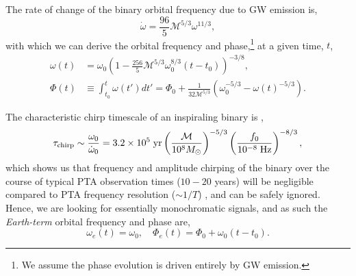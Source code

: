 \documentclass[prd,twocolumn,showpacs,nofootinbib]{revtex4}
\begin{document}
The rate of change of the binary orbital frequency due to GW emission is,
\begin{equation}
\dot{\omega} = \frac{96}{5}\mathcal{M}^{5/3}\omega^{11/3},
\end{equation}
with which we can derive the orbital frequency and phase,\footnote{We assume the phase evolution is driven entirely by GW emission.}  at a given time, $t$,
\begin{align} \label{eq:FullFreqPhase}
\omega(t) &= \omega_0\left(1 - \frac{256}{5}\mathcal{M}^{5/3}\omega_0^{8/3}(t-t_0)\right)^{-3/8},\\
\Phi(t) &\equiv \int_{t_0}^t\omega(t')dt' = \Phi_0 + \frac{1}{32\mathcal{M}^{5/3}}\left(\omega_0^{-5/3} - \omega(t)^{-5/3}\right).
\end{align}

The characteristic chirp timescale of an inspiraling binary is \citep{ellisbayesian2013},
\begin{equation}
\tau_{\rm chirp} \sim \frac{\omega_0}{\dot\omega_0} = 3.2\times 10^5\;{\rm yr}\left(\frac{\mathcal{M}}{10^8M_{\odot}}\right)^{-5/3}\left(\frac{f_0}{10^{-8}\;{\rm Hz}}\right)^{-8/3},
\end{equation}
which shows us that frequency and amplitude chirping of the binary over the course of typical PTA observation times ($10-20$ years) will be negligible compared to PTA frequency resolution ($\sim 1/T$) \citep{yardley-2010,sesana-vecchio-measuring-2010}, and can be safely ignored. Hence, we are looking for essentially monochromatic signals, and as such the {\it Earth-term} orbital frequency and phase are,
\begin{equation}
\omega_e(t) = \omega_0,\quad \Phi_e(t) = \Phi_0 + \omega_0(t-t_0).
\end{equation}
\end{document}
